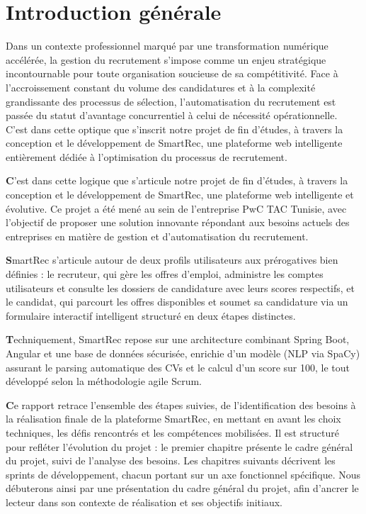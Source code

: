
\setcounter{page}{1}

\chapter*{Introduction générale}


Dans un contexte professionnel marqué par une transformation numérique accélérée, la gestion du recrutement s'impose comme un enjeu stratégique incontournable pour toute organisation soucieuse de sa compétitivité. Face à l'accroissement constant du volume des candidatures et à la complexité grandissante des processus de sélection, l'automatisation du recrutement est passée du statut d'avantage concurrentiel à celui de nécessité opérationnelle. C'est dans cette optique que s'inscrit notre projet de fin d'études, à travers la conception et le développement de SmartRec, une plateforme web intelligente entièrement dédiée à l'optimisation du processus de recrutement.
\par 
\textbf C'est dans cette logique que s'articule notre projet de fin d'études, à travers la conception et le développement de SmartRec, une plateforme web intelligente et évolutive. Ce projet a été mené au sein de l'entreprise PwC TAC Tunisie, avec l'objectif de proposer une solution innovante répondant aux besoins actuels des entreprises en matière de gestion et d'automatisation du recrutement.
\par 
\textbf SmartRec s'articule autour de deux profils utilisateurs aux prérogatives bien définies : le recruteur, qui gère les offres d'emploi, administre les comptes utilisateurs et consulte les dossiers de candidature avec leurs scores respectifs, et le candidat, qui parcourt les offres disponibles et soumet sa candidature via un formulaire interactif intelligent structuré en deux étapes distinctes.
\par 
\textbf Techniquement, SmartRec repose sur une architecture combinant Spring Boot, Angular et une base de données sécurisée, enrichie d'un modèle (NLP via SpaCy) assurant le parsing automatique des CVs et le calcul d'un score sur 100, le tout développé selon la méthodologie agile Scrum.
\par 
\textbf Ce rapport retrace l'ensemble des étapes suivies, de l'identification des besoins à la réalisation finale de la plateforme SmartRec, en mettant en avant les choix techniques, les défis rencontrés et les compétences mobilisées. Il est structuré pour refléter l'évolution du projet : le premier chapitre présente le cadre général du projet, suivi de l'analyse des besoins. Les chapitres suivants décrivent les sprints de développement, chacun portant sur un axe fonctionnel spécifique. Nous débuterons ainsi par une présentation du cadre général du projet, afin d'ancrer le lecteur dans son contexte de réalisation et ses objectifs initiaux.